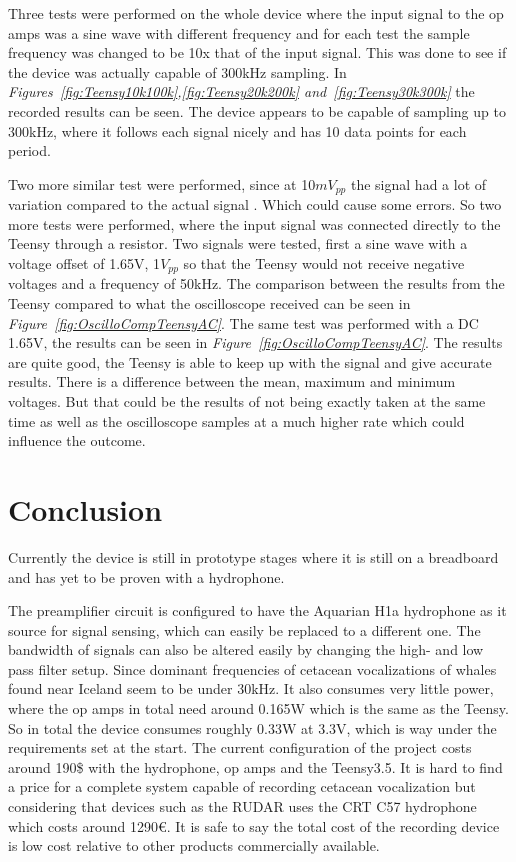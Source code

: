 Three tests were performed on the whole device where the input signal to the op amps was a sine wave with different frequency and for each test the sample frequency was changed to be 10x that of the input signal.
This was done to see if the device was actually capable of 300kHz sampling.
In \textit{Figures~\ref{fig:Teensy10k100k},\ref{fig:Teensy20k200k} and~\ref{fig:Teensy30k300k}} the recorded results can be seen.
The device appears to be capable of sampling up to 300kHz, where it follows each signal nicely and has 10 data points for each period.

Two more similar test were performed, since at 10$mV_{pp}$ the signal had a lot of variation compared to the actual signal .
Which could cause some errors.
So two more tests were performed, where the input signal was connected directly to the Teensy through a resistor.
Two signals were tested, first a sine wave with a voltage offset of 1.65V, 1$V_{pp}$ so that the Teensy would not receive negative voltages and a frequency of 50kHz.
The comparison between the results from the Teensy compared to what the oscilloscope received can be seen in \textit{Figure~\ref{fig:OscilloCompTeensyAC}}.
The same test was performed with a DC 1.65V, the results can be seen in \textit{Figure~\ref{fig:OscilloCompTeensyAC}}. 
The results are quite good, the Teensy is able to keep up with the signal and give accurate results.
There is a difference between the mean, maximum and minimum voltages. 
But that could be the results of not being exactly taken at the same time as well as the oscilloscope samples at a much higher rate which could influence the outcome.


\clearpage


\section{Conclusion}\label{sec:conclusions}

Currently the device is still in prototype stages where it is still on a breadboard and has yet to be proven with a hydrophone.

The preamplifier circuit is configured to have the Aquarian H1a hydrophone as it source for signal sensing, which can easily be replaced to a different one.
The bandwidth of signals can also be altered easily by changing the high- and low pass filter setup.
Since dominant frequencies of cetacean vocalizations of whales found near Iceland seem to be under 30kHz.
It also consumes very little power, where the op amps in total need around 0.165W which is the same as the Teensy.
So in total the device consumes roughly 0.33W at 3.3V, which is way under the requirements set at the start.
The current configuration of the project costs around 190\$ with the hydrophone, op amps and the Teensy3.5.
It is hard to find a price for a complete system capable of recording cetacean vocalization but considering that devices such as the RUDAR uses the CRT C57 hydrophone which costs around 1290€.
It is safe to say the total cost of the recording device is low cost relative to other products commercially available.

